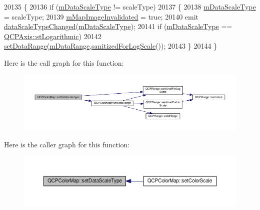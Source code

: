 \begin{DoxyCode}
20135 \{
20136   \textcolor{keywordflow}{if} (\hyperlink{class_q_c_p_color_map_ab28a4b2def408f83b9818799d5f18446}{mDataScaleType} != scaleType)
20137   \{
20138     \hyperlink{class_q_c_p_color_map_ab28a4b2def408f83b9818799d5f18446}{mDataScaleType} = scaleType;
20139     \hyperlink{class_q_c_p_color_map_ac9aea6a5c193d7fa866bc7b26e79ef2c}{mMapImageInvalidated} = \textcolor{keyword}{true};
20140     emit \hyperlink{class_q_c_p_color_map_a978d5d5c9f68cffef8c902b855c04490}{dataScaleTypeChanged}(\hyperlink{class_q_c_p_color_map_ab28a4b2def408f83b9818799d5f18446}{mDataScaleType});
20141     \textcolor{keywordflow}{if} (\hyperlink{class_q_c_p_color_map_ab28a4b2def408f83b9818799d5f18446}{mDataScaleType} == \hyperlink{class_q_c_p_axis_a36d8e8658dbaa179bf2aeb973db2d6f0abf5b785ad976618816dc6f79b73216d4}{QCPAxis::stLogarithmic})
20142       \hyperlink{class_q_c_p_color_map_a980b42837821159786a85b4b7dcb8774}{setDataRange}(\hyperlink{class_q_c_p_color_map_ab87609621d16cd3e9d52ad070b327b08}{mDataRange}.\hyperlink{class_q_c_p_range_aaf6a9046e78d91eeb8e89584fe46b034}{sanitizedForLogScale}());
20143   \}
20144 \}
\end{DoxyCode}


Here is the call graph for this function\+:\nopagebreak
\begin{figure}[H]
\begin{center}
\leavevmode
\includegraphics[width=350pt]{class_q_c_p_color_map_a9d20aa08e3c1f20f22908c45b9c06511_cgraph}
\end{center}
\end{figure}




Here is the caller graph for this function\+:\nopagebreak
\begin{figure}[H]
\begin{center}
\leavevmode
\includegraphics[width=350pt]{class_q_c_p_color_map_a9d20aa08e3c1f20f22908c45b9c06511_icgraph}
\end{center}
\end{figure}


